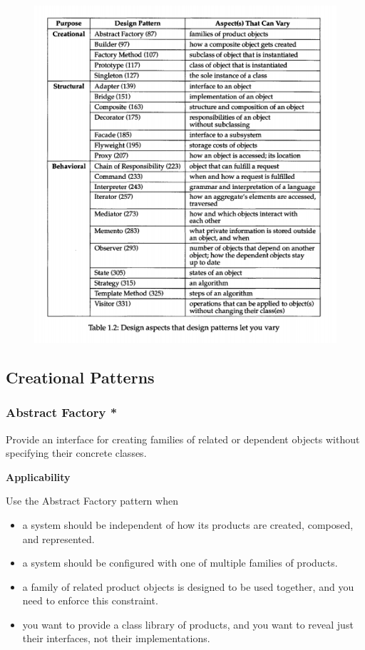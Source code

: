 \documentclass{article}
\begin{document}
\begin{figure}
    \centering
    \includegraphics[width=400pt]{design-patterns.png}
\end{figure}

\newpage
\subsection{Creational Patterns}
\subsubsection{Abstract Factory *}
Provide an interface for creating families of related or dependent objects without specifying their concrete classes.

\textbf{Applicability}

Use the Abstract Factory pattern when
\begin{itemize}
    \item a system should be independent of how its products are created, composed, and represented.
    \item a system should be configured with one of multiple families of products.
    \item a family of related product objects is designed to be used together, and you need to enforce this constraint.
    \item you want to provide a class library of products, and you want to reveal just their interfaces, not their implementations.
\end{itemize}
\end{document}
